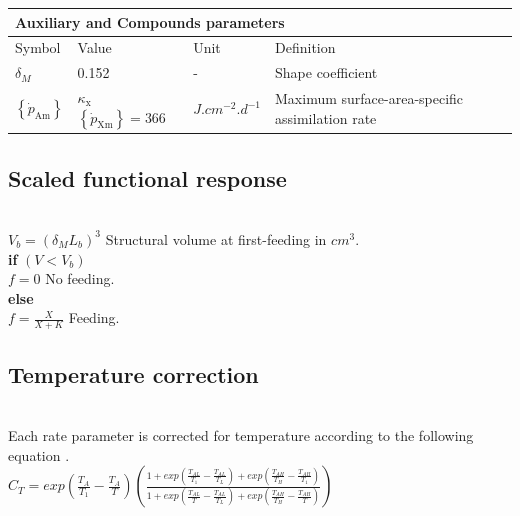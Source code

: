 \begin{table}[H]
\centering
\begin{adjustbox}{width=1.2\textwidth}
\begin{tabular}{l|l|l|l}
\hline
\multicolumn{4}{l}{Auxiliary and Compounds parameters}   \\
\hline
Symbol & Value & Unit & Definition                   \\
$\delta_{M}$
	& 0.152
	& -
	& Shape coefficient                               \\
$\left \{ \dot{p}_\mathrm{Am} \right \}$
	& $\kappa_{\mathrm{x}} $ $\left \{ \dot{p}_\mathrm{Xm} \right \}=366$
	& $J.cm^{-2}.d^{-1}$
	& Maximum surface-area-specific assimilation rate\\
\hline
\end{tabular}
\end{adjustbox}
\end{table}

\subsection*{Scaled functional response}
\hfill \\

$V_{b} = (\delta_{M}L_{b})^3$ \hfill Structural volume at first-feeding in $cm^3$.\\

\textbf{if} $(V < V_{b})$ \\

$f = 0$ \hfill No feeding.\\

\textbf{else}\\

$f= \frac{X}{X+K}$	    \hfill Feeding.\\

\subsection*{Temperature correction}
\hfill \\

Each rate parameter is corrected for temperature according to the following equation \citep{Kooi2009}.\\

$
	C_{T} = exp\left ( \frac{T_{A}}{T_{1}} - \frac{T_{A}}{T} \right )
	\left ( \frac
				{1+exp\left ( \frac{T_{AL}}{T_{1}} - \frac{T_{AL}}{T_{L}} \right )
				  +exp\left ( \frac{T_{AH}}{T_{H}} - \frac{T_{AH}}{T_{1}} \right )}
				{1+exp\left ( \frac{T_{AL}}{T} - \frac{T_{AL}}{T_{L}} \right )
				  +exp\left ( \frac{T_{AH}}{T_{H}} - \frac{T_{AH}}{T} \right )}
	\right )
$\\

